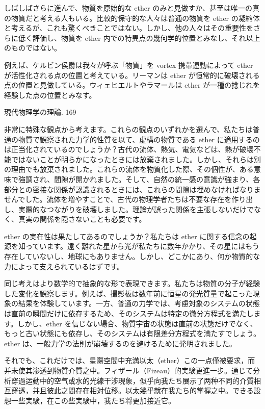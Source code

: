 \documentclass[a4paper,11pt,openany]{ltjsbook}
\begin{document}
しばしばさらに進んで、物質を原始的な ether のみと見做すか、甚至は唯一の真の物質だと考える人もいる。比較的保守的な人々は普通の物質を ether の凝縮体と考えるが、これも驚くべきことではない。しかし、他の人々はその重要性をさらに低く評価し、物質を ether 内での特異点の幾何学的位置とみなし、それ以上のものではない。

例えば、ケルビン侯爵は我々が呼ぶ「物質」を vortex 携帯運動によって ether が活性化される点の位置と考えている。リーマンは ether が恒常的に破壊される点の位置と見做している。ウィェヒエルトやラマールは ether が一種の捻じれを経験した点の位置とみなす。

現代物理学の理論. 169

非常に特殊な観点から考えます。これらの観点のいずれかを選んで、私たちは普通の物質で観察された力学的性質を以て、虚構の物質である ether に適用するのは正当化されているのでしょうか？古代の流体、熱気、電気などは、熱が破壊不能ではないことが明らかになったときには放棄されました。しかし、それらは別の理由でも放棄されました。これらの流体を物質化した際、その個性が、ある意味で強調され、間隙が開かれました。そして、自然の統一感の意識が強まり、各部分との密接な関係が認識されるときには、これらの間隙は埋めなければなりませんでした。流体を増やすことで、古代の物理学者たちは不要な存在を作り出し、実際的なつながりを破壊しました。理論が誤った関係を主張しないだけでなく、真実の関係を隠さないことも必要です。

ether の実在性は果たしてあるのでしょうか？私たちは ether に関する信念の起源を知っています。遠く離れた星から光が私たちに数年かかり、その星にはもう存在していないし、地球にもありません。しかし、どこかにあり、何か物質的な力によって支えられているはずです。

同じ考えはより数学的で抽象的な形で表現できます。私たちは物質の分子が経験した変化を観察します。例えば、撮影板は数年前に恒星の発光質量で起こった現象の結果を体験しています。一方、普通の力学では、考慮対象のシステムの状態は直前の瞬間だけに依存するため、そのシステムは特定の微分方程式を満たします。しかし、ether を信じない場合、物質宇宙の状態は直前の状態だけでなく、もっと古い状態にも依存し、そのシステムは有限差分方程式を満たすでしょう。 ether は、一般力学の法則が崩壊するのを避けるために発明されました。

それでも、これだけでは、星際空間中充満以太（ether）この一点僅被要求，而并未使其渗透到物質介質之中。フィザール（Fizeau）的実験更進一步。通じて分析穿過运動中的空气或水的光線干涉現象，似乎向我たち展示了两种不同的介質相互穿透，并且彼此之間存在相対位移。以太幾乎就在我たち的掌握之中。できる設想一些実験，在この些実験中，我たち将更加接近它。
\end{document}
